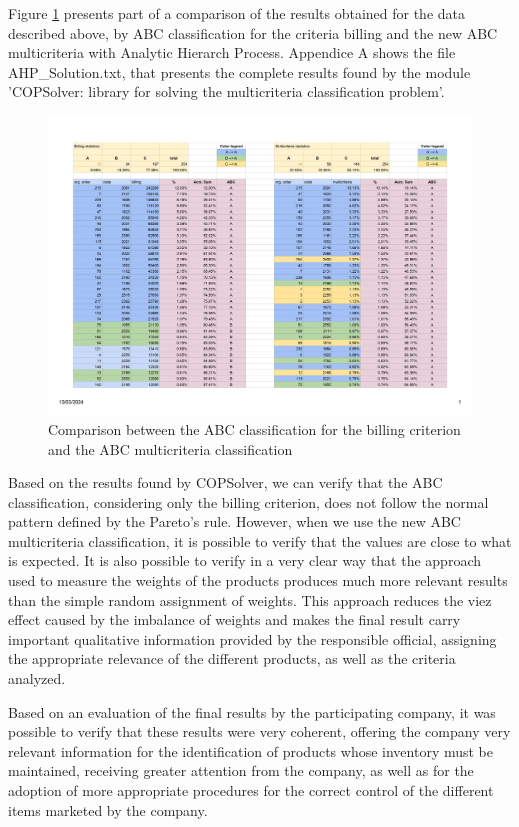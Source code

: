 \documentclass[10pt,fleqn,a4paper,twoside]{article}
\begin{document}
Figure \ref{fig:results} presents part of a comparison of the results obtained for the data described above, by ABC classification for the criteria billing and the new ABC multicriteria with Analytic Hierarch Process. Appendice A shows the file AHP\_Solution.txt, that presents the complete results found by the module 'COPSolver: library for solving the multicriteria classification problem'.

\begin{figure}[ht]
	\includegraphics[width=\linewidth]{files/0001.jpg}
  	\caption{Comparison between the ABC classification for the billing criterion and the ABC multicriteria classification}
  	\label{fig:results}
\end{figure} 

Based on the results found by COPSolver, we can verify that the ABC classification, considering only the billing criterion, does not follow the normal pattern defined by the Pareto's rule. However, when we use the new ABC multicriteria classification, it is possible to verify that the values are close to what is expected. It is also possible to verify in a very clear way that the approach used to measure the weights of the products produces much more relevant results than the simple random assignment of weights. This approach reduces the viez effect caused by the imbalance of weights and makes the final result carry important qualitative information provided by the responsible official, assigning the appropriate relevance of the different products, as well as the criteria analyzed.

Based on an evaluation of the final results by the participating company, it was possible to verify that these results were very coherent, offering the company very relevant information for the identification of products whose inventory must be maintained, receiving greater attention from the company, as well as for the adoption of more appropriate procedures for the correct control of the different items marketed by the company.
\end{document}

